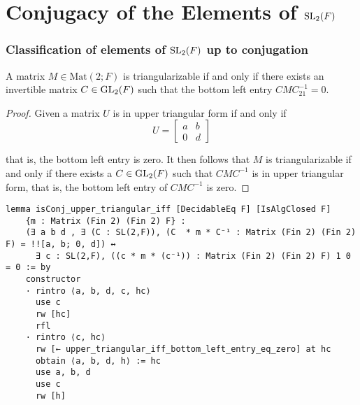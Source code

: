 \section{Conjugacy of the Elements of $\operatorname{SL}_2(F)$}

\subsubsection{Classification of elements of $\operatorname{SL}_2(F)$ up to conjugation}

\begin{lemma}
\label{isConj_upper_triangular_iff}
\leanok
    A matrix $M \in\textrm{Mat}(2; F)$ is triangularizable if and only if there exists an invertible matrix $C \in \operatorname{GL}_2(F)$ such that the bottom left entry
    $C M C^{-1}_{21} = 0$.
\end{lemma}

\begin{proof}
\leanok
    Given a matrix $U$ is in upper triangular form if and only if
    \[
    U = \begin{bmatrix}
    a & b\\
    0 & d
    \end{bmatrix}
    \]
    
    that is, the bottom left entry is zero. It then follows that $M$ is triangularizable if and only if
    there exists a $C \in \operatorname{GL}_2(F)$ such that $C M C^{-1}$ is in upper triangular form, that is, the bottom left entry of $C M C^{-1}$ is zero. 
\end{proof}
\begin{footnotesize}
\begin{verbatim}
lemma isConj_upper_triangular_iff [DecidableEq F] [IsAlgClosed F]
    {m : Matrix (Fin 2) (Fin 2) F} :
    (∃ a b d , ∃ (C : SL(2,F)), (C  * m * C⁻¹ : Matrix (Fin 2) (Fin 2) F) = !![a, b; 0, d]) ↔
      ∃ c : SL(2,F), ((c * m * (c⁻¹)) : Matrix (Fin 2) (Fin 2) F) 1 0 = 0 := by
    constructor
    · rintro ⟨a, b, d, c, hc⟩
      use c
      rw [hc]
      rfl
    · rintro ⟨c, hc⟩
      rw [← upper_triangular_iff_bottom_left_entry_eq_zero] at hc
      obtain ⟨a, b, d, h⟩ := hc
      use a, b, d
      use c
      rw [h]
\end{verbatim}
\end{footnotesize}

